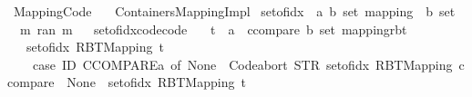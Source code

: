 %
\begin{isabellebody}%
%
%
\isadelimtheory
%
\endisadelimtheory
%
\isatagtheory
{}\isamarkupfalse%
\ Mapping{\isacharunderscore}{\kern0pt}Code\isanewline
\ \ \ {\isachardoublequoteopen}Containers{\isachardot}{\kern0pt}Mapping{\isacharunderscore}{\kern0pt}Impl{\isachardoublequoteclose}\isanewline
{}%
\endisatagtheory
{\isafoldtheory}%
%
\isadelimtheory
\isanewline
%
\endisadelimtheory
\isanewline
{}\isamarkupfalse%
\ set{\isacharunderscore}{\kern0pt}of{\isacharunderscore}{\kern0pt}idx\ {\isacharcolon}{\kern0pt}{\isacharcolon}{\kern0pt}\ {\isachardoublequoteopen}{\isacharparenleft}{\kern0pt}{\isacharprime}{\kern0pt}a{\isacharcomma}{\kern0pt}\ {\isacharprime}{\kern0pt}b\ set{\isacharparenright}{\kern0pt}\ mapping\ {\isasymRightarrow}\ {\isacharprime}{\kern0pt}b\ set{\isachardoublequoteclose}\ \isanewline
\ \ {\isachardoublequoteopen}{\isasymlambda}m{\isachardot}{\kern0pt}\ {\isasymUnion}{\isacharparenleft}{\kern0pt}ran\ m{\isacharparenright}{\kern0pt}{\isachardoublequoteclose}%
\isadelimproof
\ %
\endisadelimproof
%
\isatagproof
\isacommand{{\isachardot}{\kern0pt}}\isamarkupfalse%
%
\endisatagproof
{\isafoldproof}%
%
\isadelimproof
%
\endisadelimproof
\isanewline
\isanewline
{}\isamarkupfalse%
\ set{\isacharunderscore}{\kern0pt}of{\isacharunderscore}{\kern0pt}idx{\isacharunderscore}{\kern0pt}code{\isacharbrackleft}{\kern0pt}code{\isacharbrackright}{\kern0pt}{\isacharcolon}{\kern0pt}\isanewline
\ \ \ t\ {\isacharcolon}{\kern0pt}{\isacharcolon}{\kern0pt}\ {\isachardoublequoteopen}{\isacharparenleft}{\kern0pt}{\isacharprime}{\kern0pt}a\ {\isacharcolon}{\kern0pt}{\isacharcolon}{\kern0pt}\ ccompare{\isacharcomma}{\kern0pt}\ {\isacharprime}{\kern0pt}b\ set{\isacharparenright}{\kern0pt}\ mapping{\isacharunderscore}{\kern0pt}rbt{\isachardoublequoteclose}\isanewline
\ \ \ {\isachardoublequoteopen}set{\isacharunderscore}{\kern0pt}of{\isacharunderscore}{\kern0pt}idx\ {\isacharparenleft}{\kern0pt}RBT{\isacharunderscore}{\kern0pt}Mapping\ t{\isacharparenright}{\kern0pt}\ {\isacharequal}{\kern0pt}\isanewline
\ \ \ \ {\isacharparenleft}{\kern0pt}case\ ID\ CCOMPARE{\isacharparenleft}{\kern0pt}{\isacharprime}{\kern0pt}a{\isacharparenright}{\kern0pt}\ of\ None\ {\isasymRightarrow}\ Code{\isachardot}{\kern0pt}abort\ {\isacharparenleft}{\kern0pt}STR\ {\isacharprime}{\kern0pt}{\isacharprime}{\kern0pt}set{\isacharunderscore}{\kern0pt}of{\isacharunderscore}{\kern0pt}idx\ RBT{\isacharunderscore}{\kern0pt}Mapping{\isacharcolon}{\kern0pt}\ ccompare\ {\isacharequal}{\kern0pt}\ None{\isacharprime}{\kern0pt}{\isacharprime}{\kern0pt}{\isacharparenright}{\kern0pt}\ {\isacharparenleft}{\kern0pt}{\isasymlambda}{\isacharunderscore}{\kern0pt}{\isachardot}{\kern0pt}\ set{\isacharunderscore}{\kern0pt}of{\isacharunderscore}{\kern0pt}idx\ {\isacharparenleft}{\kern0pt}RBT{\isacharunderscore}{\kern0pt}Mapping\ t{\isacharparenright}{\kern0pt}{\isacharparenright}{\kern0pt}\isanewline

\end{isabellebody}
